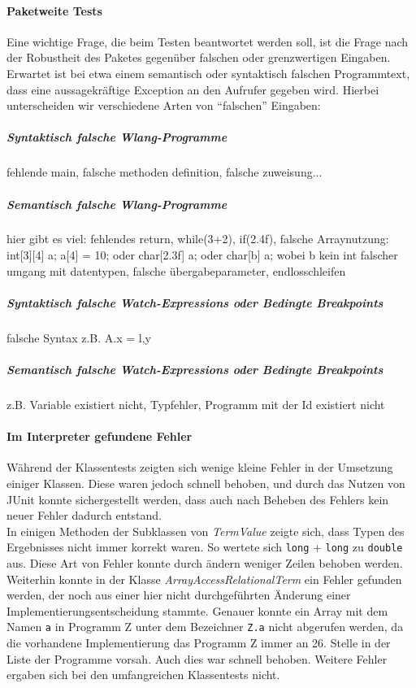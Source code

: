 \documentclass[parskip=full]{scrartcl}
\begin{document}
\paragraph{Paketweite Tests}
Eine wichtige Frage, die beim Testen beantwortet werden soll, ist die Frage nach der Robustheit des Paketes gegenüber falschen oder grenzwertigen Eingaben. Erwartet ist bei etwa einem semantisch oder syntaktisch falschen Programmtext, dass eine aussagekräftige Exception an den Aufrufer gegeben wird. Hierbei unterscheiden wir verschiedene Arten von \enquote{falschen} Eingaben:
\subparagraph{Syntaktisch falsche Wlang-Programme}
fehlende main, falsche methoden definition, falsche zuweisung...
\subparagraph{Semantisch falsche Wlang-Programme}
hier gibt es viel: 
fehlendes return, while(3+2), if(2.4f), falsche Arraynutzung: int[3][4] a; a[4] = 10; oder char[2.3f] a; oder char[b] a; wobei b kein int
falscher umgang mit datentypen, falsche übergabeparameter, endlosschleifen
\subparagraph{Syntaktisch falsche Watch-Expressions oder Bedingte Breakpoints}
falsche Syntax z.B. A.x = l,y
\subparagraph{Semantisch falsche Watch-Expressions oder Bedingte Breakpoints}
z.B. Variable existiert nicht, Typfehler, Programm mit der Id existiert nicht

\paragraph{Im Interpreter gefundene Fehler}
Während der Klassentests zeigten sich wenige kleine Fehler in der Umsetzung einiger Klassen. Diese waren jedoch schnell behoben, und durch das Nutzen von JUnit konnte sichergestellt werden, dass auch nach Beheben des Fehlers kein neuer Fehler dadurch entstand.\\
In einigen Methoden der Subklassen von \textit{TermValue} zeigte sich, dass Typen des Ergebnisses nicht immer korrekt waren. So wertete sich \texttt{long} + \texttt{long} zu \texttt{double} aus. Diese Art von Fehler konnte durch ändern weniger Zeilen behoben werden.\\
Weiterhin konnte in der Klasse \textit{ArrayAccessRelationalTerm} ein Fehler gefunden werden, der noch aus einer hier nicht durchgeführten Änderung einer Implementierungsentscheidung stammte. Genauer konnte ein Array mit dem Namen \texttt{a} in Programm Z unter dem Bezeichner \texttt{Z.a} nicht abgerufen werden, da die vorhandene Implementierung das Programm Z immer an 26. Stelle in der Liste der Programme vorsah. Auch dies war schnell behoben. Weitere Fehler ergaben sich bei den umfangreichen Klassentests nicht.
\end{document}

